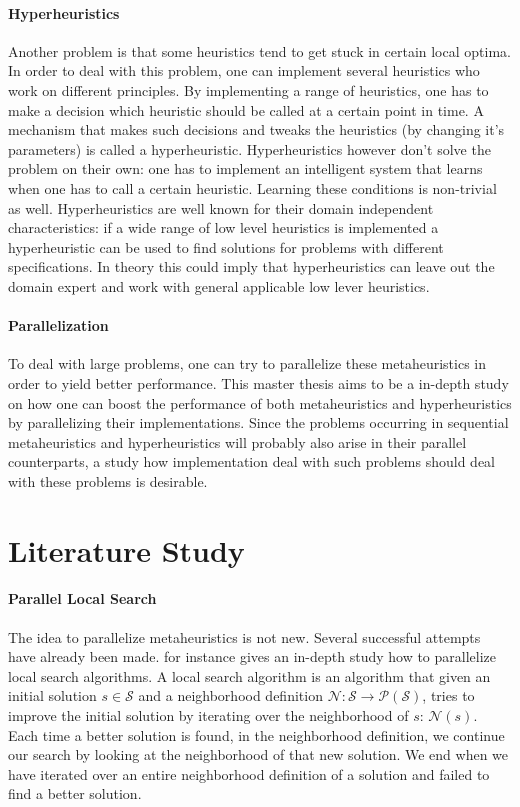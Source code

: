 \documentclass{IEEEconf}
\newcommand{\scal}{\mathcal{S}}
\newcommand{\pcal}{\mathcal{P}}
\newcommand{\ncal}{\mathcal{N}}
\newcommand{\func}[2]{\ensuremath{#1\left(#2\right)}}
\newcommand{\powerset}[1]{\func{\pcal{}}{#1}}
\begin{document}
\paragraph{Hyperheuristics}
Another problem is that some heuristics tend to get stuck in certain local optima. In order to deal with this problem, one can implement several heuristics who work on different principles. By implementing a range of heuristics, one has to make a decision which heuristic should be called at a certain point in time. A mechanism that makes such decisions and tweaks the heuristics (by changing it's parameters) is called a hyperheuristic. Hyperheuristics however don't solve the problem on their own: one has to implement an intelligent system that learns when one has to call a certain heuristic. Learning these conditions is non-trivial as well. Hyperheuristics are well known for their domain independent characteristics: if a wide range of low level heuristics is implemented a hyperheuristic can be used to find solutions for problems with different specifications. In theory this could imply that hyperheuristics can leave out the domain expert and work with general applicable low lever heuristics.
\paragraph{Parallelization}
To deal with large problems, one can try to parallelize these metaheuristics in order to yield better performance. This master thesis aims to be a in-depth study on how one can boost the performance of both metaheuristics and hyperheuristics by parallelizing their implementations. Since the problems occurring in sequential metaheuristics and hyperheuristics will probably also arise in their parallel counterparts, a study how implementation deal with such problems should deal with these problems is desirable.
\section{Literature Study}
\paragraph{Parallel Local Search}
The idea to parallelize metaheuristics is not new. Several successful attempts have already been made. \cite{verhoeven1996parallel} for instance gives an in-depth study how to parallelize local search algorithms. A local search algorithm is an algorithm that given an initial solution $s\in\scal{}$ and a neighborhood definition $\ncal{}:\scal{}\rightarrow\powerset{\scal{}}$, tries to improve the initial solution by iterating over the neighborhood of $s$: $\func{\ncal{}}{s}$. Each time a better solution is found, in the neighborhood definition, we continue our search by looking at the neighborhood of that new solution. We end when we have iterated over an entire neighborhood definition of a solution and failed to find a better solution.
\end{document}
